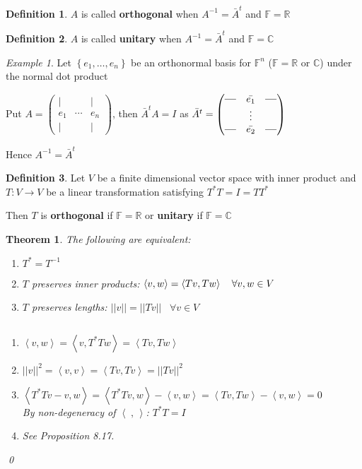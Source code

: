 \documentclass[11pt, a4paper]{report}
\makeatletter
\numberwithin{equation}{section}
\newcommand{\R}{\mathbb{R}}
\newcommand{\C}{\mathbb{C}}
\newcommand{\F}{\mathbb{F}}
\newcommand{\spn}[1]{\left\langle #1 \right\rangle}
\newcommand{\spb}{\spn{\;,\,}}
\newcommand{\sett}[1]{\left\lbrace #1 \right\rbrace}
\newcommand{\pmx}[1]{\begin{pmatrix}#1\end{pmatrix}}
\numberwithin{equation}{subsection}
\theoremstyle{plain}
\newtheorem{thm}{Theorem}[chapter] %
\theoremstyle{definition}
\newtheorem{defn}{Definition}[chapter]
\theoremstyle{remark}
\newtheorem{exmp}{Example}[chapter]
\newtheorem*{prf}{Proof}
\renewenvironment{prf}[1][\proofname]{\par
  \vspace{-\topsep}%
  \normalfont
  \topsep0pt \partopsep0pt %
  \trivlist
  \item[\hskip\labelsep
        \itshape
    #1\@addpunct{.}]\ignorespaces
}{%
  \popQED\endtrivlist\@endpefalse
  \addvspace{6pt plus 6pt} %
}
\newcommand{\pr}[1]{\begin{adjustwidth}{1cm}{} \begin{prf} #1 \end{prf} \end{adjustwidth}}
\makeatother
\begin{document}
\begin{defn} 
$A$ is called \textbf{orthogonal} when $A^{-1} = \bar{A}^t$ and $\F = \R$
\end{defn}

\begin{defn}
$A$ is called \textbf{unitary} when $A^{-1} = \bar{A}^t$ and $\F = \C$
\end{defn}

\begin{exmp}
Let $\sett{e_1, \ldots, e_n}$ be an orthonormal basis for $\F^n$ ($\F = \R$ or $\C$) under the normal dot product

Put $A = \pmx{| & & |\\e_1 & \cdots & e_n\\| & & |}$, then $\bar{A}^tA = I$ as $\bar{A}^t = \pmx{\text{\textbf{---}} & \bar{e_1} & \text{\textbf{---}}\\ & \vdots \\ \text{\textbf{---}} & \bar{e_2} & \text{\textbf{---}}}$

Hence $A^{-1} = \bar{A}^t$
\end{exmp}

\begin{defn}
Let $V$ be a finite dimensional vector space with inner product and $T: V \to V$ be a linear transformation satisfying $T^*T = I = TT^*$

Then $T$ is \textbf{orthogonal} if $\F = \R$ or \textbf{unitary} if $\F = \C$
\end{defn}

\newpage

\begin{thm}
The following are equivalent:
\begin{adjustwidth}{1cm}{}
\begin{enumerate}[(1) ]
\item $T^* = T^{-1}$
\item $T$ preserves inner products: $\spn{v,w} = \spn{Tv,Tw} \hspace*{10pt} \forall v,w \in V$
\item $T$ preserves lengths: $||v|| = ||Tv|| \hspace{10pt} \forall v \in V$
\end{enumerate}
\end{adjustwidth}
\pr{${}$
\begin{adjustwidth}{1.5cm}{}
\begin{enumerate}
\item[$(1) \Rightarrow (2)$ ] $\spn{v,w} = \spn{v, T^*Tw} = \spn{Tv, Tw}$\\
\item[$(2) \Rightarrow (3)$ ] $||v||^2 = \spn{v,v} = \spn{Tv,Tv} = ||Tv||^2$\\
\item[$(2) \Rightarrow (1)$ ] $\spn{T^*Tv - v,w} = \spn{T^*Tv, w} - \spn{v,w} = \spn{Tv,Tw} - \spn{v,w} = 0$\\ By non-degeneracy of $\spb$: $T^*T = I$\\
\item[$(3) \Rightarrow (2)$ ] See Proposition 8.17.
\end{enumerate}
\end{adjustwidth}
}\qed
\end{thm}
\end{document}
